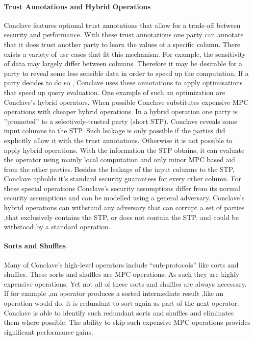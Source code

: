 \paragraph{Trust Annotations and Hybrid Operations}
Conclave features optional trust annotations that allow for a trade-off between security and performance. With these trust annotations one party can annotate that it does trust another party to learn the values of a specific column. There exists a variety of use cases that fit this mechanism. For example, the sensitivity of data may largely differ between columns. Therefore it may be desirable for a party to reveal some less sensible data in order to speed up the computation. If a party decides to do so , Conclave uses these annotations to apply optimisations that speed up query evaluation. One example of such an optimization are Conclave's hybrid operators. When possible Conclave substitutes expensive MPC operations with cheaper hybrid operations. In a hybrid operation one party is ''promoted'' to a selectively-trusted party (short STP). Conclave reveals some input columns to the STP. Such leakage is only possible if the parties did explicitly allow it with the trust annotations. Otherwise it is not possible to apply hybrid operations. With the information the STP obtains, it can evaluate the operator using mainly local computation and only minor MPC based aid from the other parties. Besides the leakage of the input columns to the STP, Conclave upholds it's  standard security guarantees for every other column. For these special operations Conclave's security assumptions differ from its normal security assumptions and can be modelled using a general adversary. Conclave's hybrid operations can withstand any adversary that can corrupt a set of parties ,that exclusively contains the STP, or does not contain the STP, and could be withstood by a standard operation. 
\paragraph{Sorts and Shuffles}
Many of Conclave's high-level operators include ``sub-protocols'' like sorts and shuffles. These sorts and shuffles are MPC operations. As such they are highly expensive operations. Yet not all of these sorts and shuffles are always necessary. If for example ,an operator produces a sorted intermediate result ,like an  operation would do, it is redundant to sort again as part of the next operator. Conclave is able to identify such redundant sorts and shuffles and eliminates them where possible. The ability to skip such expensive MPC operations provides significant performance gains.



